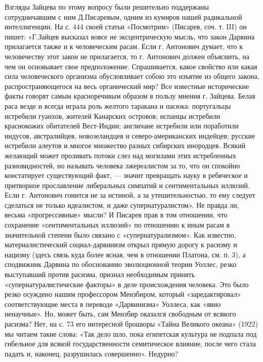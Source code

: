 Взгляды Зайцева по этому вопросу были решительно поддержаны
сотрудничавшим с ним Д.Писаревым, одним из кумиров нашей радикальной
интеллигенции. На с. 444 своей статьи «Посмотрим» (Писарев, соч. т.
III) он пишет: «Г.Зайцев высказал вовсе не эксцентрическую мысль, что
закон Дарвина прилагается также и к человеческим расам. Если г.
Антонович думает, что к человечеству этот закон не прилагается, то г.
Антонович должен объяснить, на чем он основывает свое предположение.
Спрашивается, какое свойство или какая сила человеческого организма
обусловливает собою это изъятие из общего закона, распространяющегося
на весь органический мир? Все известные исторические факты говорят
самым красноречивым образом в пользу мнения г. Зайцева. Белая раса
везде и всегда играла роль желтого таракана и пасюка: португальцы
истребили гуанхов, жителей Канарских островов; испанцы истребили
краснокожих обитателей Вест-Индии; англичане истребили или поработили
индусов, австралийцев, новозеландцев и северо-американских индейцев;
русские истребили алеутов и многое множество разных сибирских
инородцев. Всякий желающий может проливать потоки слез над могилами
этих истребленных разновидностей, но называть человека лжереалистом за
то, что он спокойно констатирует существующий факт, --- значит
превращать науку в ребяческое и притворное прославление либеральных
симпатий и сентиментальных иллюзий. Если г. Антонович гонится не за
истиной, а за утешительностью, то ему следует сделаться не только
идеалистом, и даже супернатуралистом». Не правда ли, весьма
«прогрессивные» мысли? И Писарев прав в том отношении, что сохранение
«сентиментальных иллюзий» по отношению к иным расам в значительной
степени было связано с «супернатурализмом». Как известно,
материалистический социал-дарвинизм открыл прямую дорогу к расизму и
нацизму (здесь связь куда более ясная, чем в отношении Платона, см. п.
3), а сподвижник Дарвина по обоснованию эволюционной теории Уоллес,
резко выступавший против расизма, признал необходимым принять
«супернатуралистические факторы» в деле происхождения человека. Это
было резко осуждено нашим профессором Мензбиром, который
«заредактировал» соответствующие места в переводе «Дарвинизма»
Уоллеса, как «явно ненаучные». Но, может быть, сам Мензбир оказался
свободным от всякого расизма? Нет, на с. 73 его интересной брошюры
«Тайна Великого океана» (1922) мы читаем такие слова: «Так дело шло,
пока египетская культура не подпала под гибельное для всякой
государственности семитическое влияние, после чего стала падать и,
наконец, разрушилась совершенно». Недурно?


